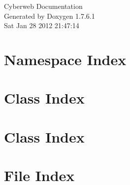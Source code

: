 \documentclass[a4paper]{book}
\begin{document}
\hypersetup{pageanchor=false,citecolor=blue}
\begin{titlepage}
\vspace*{7cm}
\begin{center}
{\Large \-Cyberweb \-Documentation }\\
\vspace*{1cm}
{\large \-Generated by Doxygen 1.7.6.1}\\
\vspace*{0.5cm}
{\small Sat Jan 28 2012 21:47:14}\\
\end{center}
\end{titlepage}
\clearemptydoublepage
{}
\tableofcontents
\clearemptydoublepage
{}
\hypersetup{pageanchor=true,citecolor=blue}
\chapter{\-Namespace \-Index}

\chapter{\-Class \-Index}

\chapter{\-Class \-Index}

\chapter{\-File \-Index}

\end{document}
